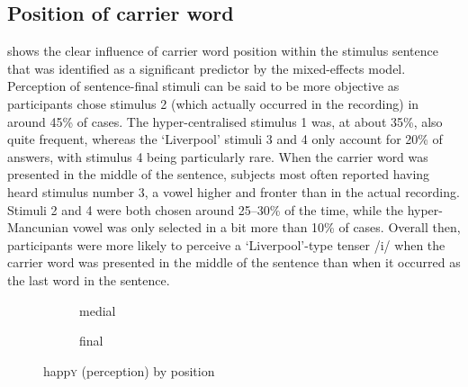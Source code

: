\subsection{Position of carrier word}
\label{sec.perc_res.happy.position}

 shows the clear influence of carrier word position within the stimulus sentence that was identified as a significant predictor by the mixed-effects model.
Perception of sentence-final stimuli can be said to be more objective as participants chose stimulus 2 (which actually occurred in the recording) in around 45\% of cases.
The hyper-centralised stimulus 1 was, at about 35\%, also quite frequent, whereas the `Liverpool' stimuli 3 and 4 only account for 20\% of answers, with stimulus 4 being particularly rare.
When the carrier word was presented in the middle of the sentence, subjects most often reported having heard stimulus number 3, a vowel higher and fronter than in the actual recording.
Stimuli 2 and 4 were both chosen around 25--30\% of the time, while the hyper-Mancunian vowel was only selected in a bit more than 10\% of cases.
Overall then, participants were more likely to perceive a `Liverpool'-type tenser /i/ when the carrier word was presented in the middle of the sentence than when it occurred as the last word in the sentence.

\begin{figure}
	
	\begin{subfigure}{0.49\textwidth}
		
			\resizebox{\linewidth}{!}{} 
		\caption{medial}
		\label{fig.bar.happy.tot.ext.med}
	\end{subfigure}
	\begin{subfigure}{0.49\textwidth}
		
			\resizebox{\linewidth}{!}{} 
		\caption{final}
		\label{fig.bar.happy.tot.ext.fin}
	\end{subfigure}
	\caption{happ\textsc{y} (perception) by position}
	\label{fig.bar.happy.tot.ext.pos}
\end{figure}

